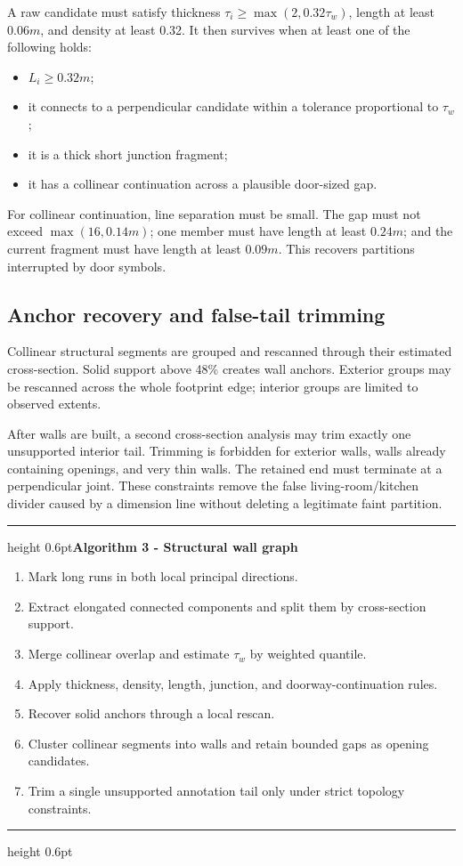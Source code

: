 \documentclass[11pt,a4paper]{article}
\newenvironment{algorithmblock}[1]{
  \par\medskip\noindent\begin{minipage}{\textwidth}
  \color{Ink!55}\hrule height 0.6pt\vspace{1.4mm}\textbf{#1}\par\smallskip\color{Ink}
}{
  \vspace{1.2mm}\color{Ink!55}\hrule height 0.6pt\end{minipage}\par\medskip
}
\begin{document}
A raw candidate must satisfy thickness $\tau_i\geq\max(2,0.32\tau_w)$, length at least $0.06m$, and density at least 0.32. It then survives when at least one of the following holds:

\begin{itemize}
  \item $L_i\geq0.32m$;
  \item it connects to a perpendicular candidate within a tolerance proportional to $\tau_w$;
  \item it is a thick short junction fragment;
  \item it has a collinear continuation across a plausible door-sized gap.
\end{itemize}

For collinear continuation, line separation must be small. The gap must not exceed $\max(16,0.14m)$; one member must have length at least $0.24m$; and the current fragment must have length at least $0.09m$. This recovers partitions interrupted by door symbols.

\subsection{Anchor recovery and false-tail trimming}

Collinear structural segments are grouped and rescanned through their estimated cross-section. Solid support above 48\% creates wall anchors. Exterior groups may be rescanned across the whole footprint edge; interior groups are limited to observed extents.

After walls are built, a second cross-section analysis may trim exactly one unsupported interior tail. Trimming is forbidden for exterior walls, walls already containing openings, and very thin walls. The retained end must terminate at a perpendicular joint. These constraints remove the false living-room/kitchen divider caused by a dimension line without deleting a legitimate faint partition.

\begin{algorithmblock}{Algorithm 3 - Structural wall graph}
\begin{enumerate}
  \item Mark long runs in both local principal directions.
  \item Extract elongated connected components and split them by cross-section support.
  \item Merge collinear overlap and estimate $\tau_w$ by weighted quantile.
  \item Apply thickness, density, length, junction, and doorway-continuation rules.
  \item Recover solid anchors through a local rescan.
  \item Cluster collinear segments into walls and retain bounded gaps as opening candidates.
  \item Trim a single unsupported annotation tail only under strict topology constraints.
\end{enumerate}
\end{algorithmblock}
\end{document}
